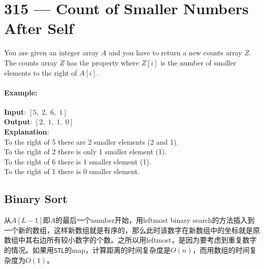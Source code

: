 \section{315 --- Count of Smaller Numbers After Self}
You are given an integer array $ A $ and you have to return a new counts array $ Z $. The counts array $ Z $ has the property where $ Z[i] $ is the number of smaller elements to the right of $ A[i] $.

\paragraph{Example:}

\begin{flushleft}
\textbf{Input}: $ [5,\;2,\;6,\;1] $
\\
\textbf{Output}: $ [2,\;1,\;1,\;0] $ 
\\
\textbf{Explanation}:
\\
To the right of 5 there are 2 smaller elements (2 and 1).
\\
To the right of 2 there is only 1 smaller element (1).
\\
To the right of 6 there is 1 smaller element (1).
\\
To the right of 1 there is 0 smaller element.
\end{flushleft}
\subsection{Binary Sort}
从$ A[L-1] $即$ A $的最后一个number开始，用leftmost binary search的方法插入到一个新的数组，这样新数组就是有序的，那么此时该数字在新数组中的坐标就是原数组中其右边所有较小数字的个数。之所以用leftmost，是因为要考虑到重复数字的情况。如果用\texttt{STL}的map，计算距离的时间复杂度是$ O(n) $，而用数组的时间复杂度为$ O(1) $。

